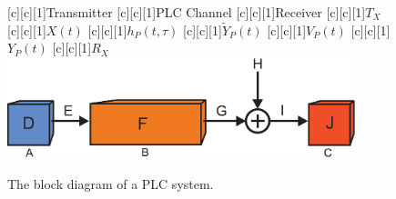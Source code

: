 \begin{figure}[h]
	\centering
	[c][1]{Transmitter}
	[c][1]{PLC Channel}
	[c][1]{Receiver}
	[c][1]{$T_X$}
	[c][1]{$X(t)$}
	[c][1]{$h_P(t,\tau)$}
	[c][1]{$\tilde{Y}_P(t)$}
	[c][1]{$V_P(t)$}
	[c][1]{$Y_P(t)$}
	[c][1]{$R_X$}
	\includegraphics[width=0.9\textwidth]{images/PLCchannel.eps}
	\caption{The block diagram of a PLC system.}
	\label{PLCchannel}
\end{figure}

